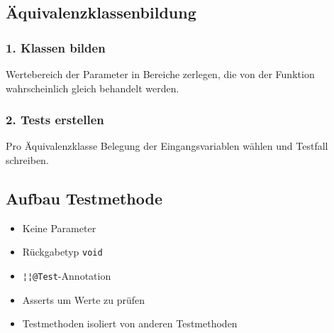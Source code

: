 \subsection{Äquivalenzklassenbildung}
\vspace{-0.8\abovedisplayskip}
\begin{minipage}[t]{0.5\columnwidth}
    \subsubsection{1. Klassen bilden}
    \raggedright%
    Wertebereich der Parameter in Bereiche zerlegen, die von der Funktion wahrscheinlich gleich behandelt werden.
\end{minipage}\hfill%
\begin{minipage}[t]{0.49\columnwidth}
    \subsubsection{2. Tests erstellen}
    \raggedright%
    Pro Äquivalenzklasse Belegung der Eingangsvariablen wählen und Testfall schreiben.
\end{minipage}

\subsection{Aufbau Testmethode}
\begin{minipage}[t]{0.65\columnwidth}
    \vspace{-0.8\abovedisplayskip}
    
\end{minipage}\hfill%
\begin{minipage}[t]{0.34\columnwidth}
    \raggedright%
    \begin{itemize}
        \item Keine Parameter
        \item Rückgabetyp \lstinline{void}
        \item \lstinline{¦¦@Test}-Annotation
        \item Asserts um Werte zu prüfen
        \item Testmethoden isoliert von anderen Testmethoden
    \end{itemize}
\end{minipage}

